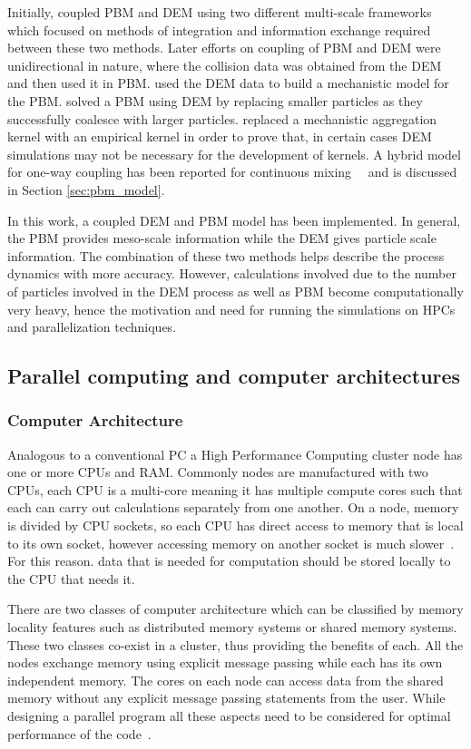 \documentclass[preprint,11pt,authoryear]{elsarticle}
\begin{document}
Initially, \cite{ingram2004} coupled PBM and DEM using two different multi-scale frameworks which 
focused on methods of integration and information exchange required between these two methods. 
Later efforts on coupling of PBM and DEM were unidirectional in nature, where the collision 
data was obtained from the DEM and then used it in PBM. \cite{gantt2006} used the DEM data 
to build a mechanistic model for the PBM. \cite{Goldschmidt2003} solved a PBM using DEM by 
replacing smaller particles as they successfully coalesce with larger particles. 
\cite{Reinhold2012} replaced a mechanistic aggregation kernel with an empirical kernel 
in order to prove that, in certain cases DEM simulations may not be necessary for the 
development of kernels. A hybrid model for one-way coupling has been reported for continuous mixing~\citep{sen2013}~\citep{sen2013b} and is discussed in Section \ref{sec:pbm_model}.

In this work, a coupled DEM and PBM model has been implemented. In general, the PBM provides meso-scale 
information while the DEM gives particle scale information. The combination of these two methods helps 
describe the process dynamics with more accuracy. However, calculations involved due to the number 
of particles involved in the DEM process as well as PBM become computationally very heavy, hence the
motivation and need for running the simulations on HPCs and parallelization techniques. 
 

\subsection{Parallel computing and computer architectures}
\subsubsection{Computer Architecture}
Analogous to a conventional PC a High Performance Computing cluster node has one
or more CPUs and RAM. Commonly nodes are manufactured with two CPUs, each CPU 
is a multi-core meaning it has multiple compute cores such that each can carry out calculations 
separately from one another. On a node, memory is divided by CPU sockets, so each CPU has direct 
access to memory that is local to its own socket, however accessing memory on another socket 
is much slower~\citep{Jin2011}. For this reason. data that is needed for computation should 
be stored locally to the CPU that needs it.  

There are two classes of computer architecture which can be classified by memory locality features such as 
distributed memory systems or shared memory systems. These two classes co-exist in a cluster, 
thus providing the benefits of each. All the nodes exchange memory using explicit message passing 
while each has its own independent memory. The cores on each node can access data from the 
shared memory without any explicit message passing statements from the user. While designing a 
parallel program all these aspects need to be considered for optimal performance of the code~\citep{Adhianto2007}.
\end{document}
